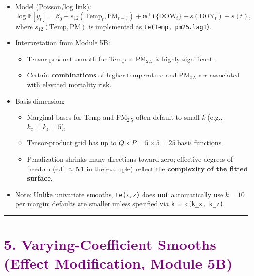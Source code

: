 \documentclass[
  letterpaper,
  DIV=11,
  numbers=noendperiod]{scrreprt}
\providecommand{\tightlist}{%
  \setlength{\itemsep}{0pt}\setlength{\parskip}{0pt}}\usepackage{longtable,booktabs,array}
\begin{document}
\begin{itemize}
\tightlist
\item
  Model (Poisson/log link): \[
  \log \mathbb{E}[y_t]
  = \beta_0
  + s_{12}(\text{Temp}_t, \text{PM}_{t-1})
  + \boldsymbol{\alpha}^\top \mathbf{1}\{\text{DOW}_t\}
  + s(\text{DOY}_t)
  + s(t),
  \] where \(s_{12}(\text{Temp},\text{PM})\) is implemented as
  \texttt{te(Temp,\ pm25.lag1)}.
\item
  Interpretation from Module 5B:

  \begin{itemize}
  \tightlist
  \item
    Tensor-product smooth for Temp × PM\(_{2.5}\) is highly significant.
  \item
    Certain \textbf{combinations} of higher temperature and PM\(_{2.5}\)
    are associated with elevated mortality risk.
  \end{itemize}
\item
  Basis dimension:

  \begin{itemize}
  \tightlist
  \item
    Marginal bases for Temp and PM\(_{2.5}\) often default to small
    \(k\) (e.g., \(k_x = k_z = 5\)),
  \item
    Tensor-product grid has up to \(Q \times P = 5 \times 5 = 25\) basis
    functions,
  \item
    Penalization shrinks many directions toward zero; effective degrees
    of freedom (edf \(\approx 5.1\) in the example) reflect the
    \textbf{complexity of the fitted surface}.
  \end{itemize}
\item
  Note: Unlike univariate smooths, \texttt{te(x,z)} does \textbf{not}
  automatically use \(k=10\) per margin; defaults are smaller unless
  specified via \texttt{k\ =\ c(k\_x,\ k\_z)}.
\end{itemize}

\begin{center}\rule{0.5\linewidth}{0.5pt}\end{center}

\hypertarget{section-47}{%
\section*{\texorpdfstring{\textcolor{purple}{5. Varying-Coefficient Smooths (Effect Modification, Module 5B)}}{}}\label{section-47}}
\end{document}
